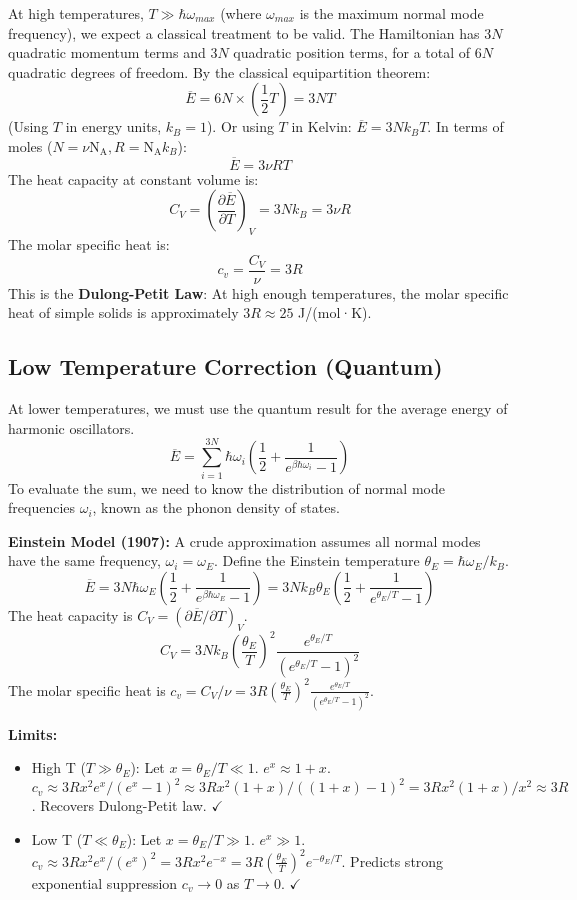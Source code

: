 \documentclass[11pt]{article}
\newcommand{\avg}[1]{\overline{#1}}
\newcommand{\pderiv}[2]{\frac{\partial #1}{\partial #2}}
\newcommand{\kb}{k_B} %
\newcommand{\gasR}{R} %
\newcommand{\Na}{\mathrm{N_A}}
\begin{document}
At high temperatures, $T \gg \hbar\omega_{max}$ (where $\omega_{max}$ is the maximum normal mode frequency), we expect a classical treatment to be valid.
The Hamiltonian has $3N$ quadratic momentum terms and $3N$ quadratic position terms, for a total of $6N$ quadratic degrees of freedom.
By the classical equipartition theorem:
\[ \avg{E} = 6N \times (\frac{1}{2}T) = 3NT \]
(Using $T$ in energy units, $k_B=1$). Or using $T$ in Kelvin: $\avg{E} = 3N \kb T$.
In terms of moles ($N = \nu \Na, \gasR = \Na \kb$):
\[ \avg{E} = 3 \nu \gasR T \]
The heat capacity at constant volume is:
\[ C_V = \left( \pderiv{\avg{E}}{T} \right)_V = 3N \kb = 3 \nu \gasR \]
The molar specific heat is:
\[ c_v = \frac{C_V}{\nu} = 3 \gasR \]
This is the \textbf{Dulong-Petit Law}: At high enough temperatures, the molar specific heat of simple solids is approximately $3R \approx 25$ J/(mol·K).

\subsection*{Low Temperature Correction (Quantum)}

At lower temperatures, we must use the quantum result for the average energy of harmonic oscillators.
\[ \avg{E} = \sum_{i=1}^{3N} \hbar\omega_i \left( \frac{1}{2} + \frac{1}{e^{\beta\hbar\omega_i}-1} \right) \]
To evaluate the sum, we need to know the distribution of normal mode frequencies $\omega_i$, known as the phonon density of states.

\textbf{Einstein Model (1907):} A crude approximation assumes all normal modes have the same frequency, $\omega_i = \omega_E$. Define the Einstein temperature $\theta_E = \hbar\omega_E / \kb$.
\[ \avg{E} = 3N \hbar\omega_E \left( \frac{1}{2} + \frac{1}{e^{\beta\hbar\omega_E}-1} \right) = 3N \kb \theta_E \left( \frac{1}{2} + \frac{1}{e^{\theta_E/T}-1} \right) \]
The heat capacity is $C_V = (\partial \avg{E} / \partial T)_V$.
\[ C_V = 3N \kb \left( \frac{\theta_E}{T} \right)^2 \frac{e^{\theta_E/T}}{(e^{\theta_E/T}-1)^2} \]
The molar specific heat is $c_v = C_V / \nu = 3\gasR (\frac{\theta_E}{T})^2 \frac{e^{\theta_E/T}}{(e^{\theta_E/T}-1)^2}$.

\textbf{Limits:}
\begin{itemize}
    \item High T ($T \gg \theta_E$): Let $x = \theta_E/T \ll 1$. $e^x \approx 1+x$.
    $c_v \approx 3\gasR x^2 e^x / (e^x-1)^2 \approx 3\gasR x^2 (1+x) / ((1+x)-1)^2 = 3\gasR x^2 (1+x) / x^2 \approx 3\gasR$. Recovers Dulong-Petit law. $\checkmark$
    \item Low T ($T \ll \theta_E$): Let $x = \theta_E/T \gg 1$. $e^x \gg 1$.
    $c_v \approx 3\gasR x^2 e^x / (e^x)^2 = 3\gasR x^2 e^{-x} = 3\gasR (\frac{\theta_E}{T})^2 e^{-\theta_E/T}$.
    Predicts strong exponential suppression $c_v \to 0$ as $T \to 0$. $\checkmark$
\end{itemize}
\end{document}
